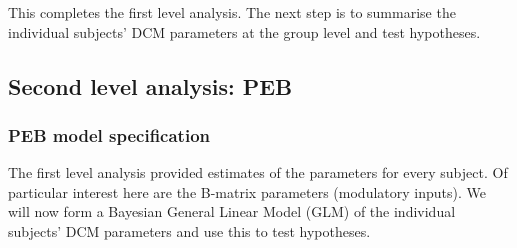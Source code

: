 \documentclass{article}
\begin{document}
This completes the first level analysis. The next step is to summarise the individual subjects' DCM parameters at the group level and test hypotheses.

\subsection{Second level analysis: PEB}
\subsubsection{PEB model specification} \label{GUI_PEBspec}
The first level analysis provided estimates of the parameters for every subject. Of particular interest here are the B-matrix parameters (modulatory inputs). We will now form a Bayesian General Linear Model (GLM) of the individual subjects' DCM parameters and use this to test hypotheses. 
\end{document}
